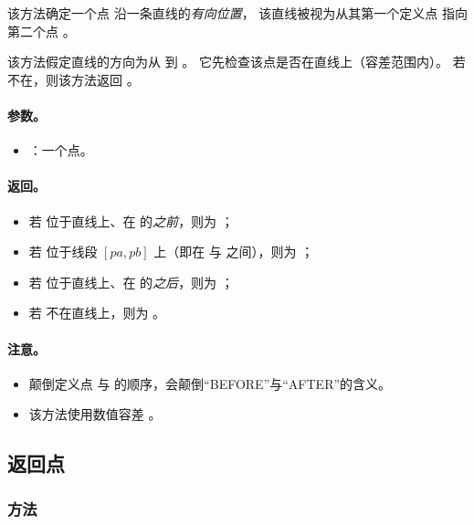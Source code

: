 该方法确定一个点  沿一条直线的\emph{有向位置}，
该直线被视为从其第一个定义点  指向第二个点
。

\medskip

该方法假定直线的方向为从  到 。
它先检查该点是否在直线上（容差范围内）。
若不在，则该方法返回 。


\medskip

\paragraph{参数。}
\begin{itemize}
  \item {}：一个点。
\end{itemize}

\paragraph{返回。}
\begin{itemize}
  \item 若  位于直线上、在  的\emph{之前}，则为 ；
  \item 若  位于线段 $[pa,pb]$ 上（即在  与  之间），则为 ；
  \item 若  位于直线上、在  的\emph{之后}，则为 ；
  \item 若  不在直线上，则为 。
\end{itemize}

\paragraph{注意。}
\begin{itemize}
  \item 颠倒定义点  与  的顺序，会颠倒``BEFORE''与``AFTER''的含义。
  \item 该方法使用数值容差 。
\end{itemize}




\subsection{返回点}


\subsubsection{方法 }
\label{ssub:method_line_get}

